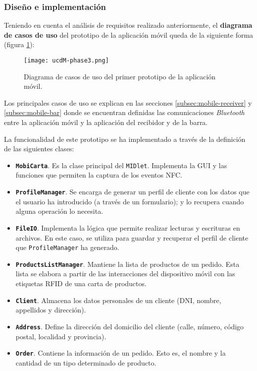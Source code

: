 \subsubsection{Diseño e implementación}
Teniendo en cuenta el análisis de requisitos realizado anteriormente, el
\textbf{diagrama de casos de uso} del prototipo de la aplicación móvil queda
de la siguiente forma (figura \ref{fig:ucdM-phase3}):

  \begin{figure}[h]
    \begin{center}
      \texttt{[image: ucdM-phase3.png]}
      \caption{Diagrama de casos de uso del primer prototipo de la aplicación
      móvil.}
      \label{fig:ucdM-phase3}
    \end{center}
  \end{figure}

Los principales casos de uso se explican en las secciones
\ref{subsec:mobile-receiver} y \ref{subsec:mobile-bar} donde se encuentran
definidas las comunicaciones \emph{Bluetooth} entre la aplicación móvil y
la aplicación del recibidor y de la barra.

La funcionalidad de este prototipo se ha implementado a través de la
definición de las siguientes clases:
\begin{itemize}
\item \textbf{\texttt{MobiCarta}}. Es la clase principal del \texttt{MIDlet}. 
Implementa la \acs{GUI} y las funciones que permiten la captura de los eventos 
\acs{NFC}.
\item \textbf{\texttt{ProfileManager}}. Se encarga de generar un perfil de 
cliente con los datos que el usuario ha introducido (a través de un 
formulario); y lo recupera cuando alguna operación lo necesita.
\item \textbf{\texttt{FileIO}}. Implementa la lógica que permite realizar 
lecturas y escrituras en archivos. En este caso, se utiliza para guardar y 
recuperar el perfil de cliente que \texttt{ProfileManager} ha 
generado.
\item \textbf{\texttt{ProductsListManager}}. Mantiene la lista de productos
de un pedido. Esta lista se elabora a partir de las interacciones del
dispositivo móvil con las etiquetas \acs{RFID} de una carta de productos.
\item \textbf{\texttt{Client}}. Almacena los datos personales de un cliente
(DNI, nombre, appellidos y dirección).
\item \textbf{\texttt{Address}}. Define la dirección del domicilio del cliente
(calle, número, código postal, localidad y provincia).
\item \textbf{\texttt{Order}}. Contiene la información de un pedido. Esto
es, el nombre y la cantidad de un tipo determinado de producto.
\end{itemize}

